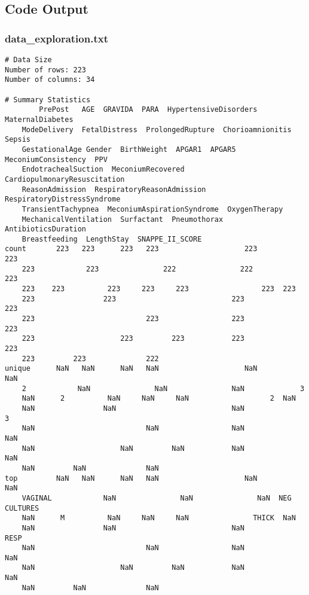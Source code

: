 \documentclass[11pt]{article}
\begin{document}
\subsection{Code Output}

\subsubsection*{data\_exploration.txt}

\begin{Verbatim}[tabsize=4]
# Data Size
Number of rows: 223
Number of columns: 34

# Summary Statistics
        PrePost   AGE  GRAVIDA  PARA  HypertensiveDisorders  MaternalDiabetes
	ModeDelivery  FetalDistress  ProlongedRupture  Chorioamnionitis        Sepsis
	GestationalAge Gender  BirthWeight  APGAR1  APGAR5 MeconiumConsistency  PPV
	EndotrachealSuction  MeconiumRecovered  CardiopulmonaryResuscitation
	ReasonAdmission  RespiratoryReasonAdmission  RespiratoryDistressSyndrome
	TransientTachypnea  MeconiumAspirationSyndrome  OxygenTherapy
	MechanicalVentilation  Surfactant  Pneumothorax  AntibioticsDuration
	Breastfeeding  LengthStay  SNAPPE_II_SCORE
count       223   223      223   223                    223               223
	223            223               222               222           223
	223    223          223     223     223                 223  223
	223                223                           223             223
	223                          223                 223                         223
	223                    223         223           223                  223
	223         223              222
unique      NaN   NaN      NaN   NaN                    NaN               NaN
	2            NaN               NaN               NaN             3
	NaN      2          NaN     NaN     NaN                   2  NaN
	NaN                NaN                           NaN               3
	NaN                          NaN                 NaN                         NaN
	NaN                    NaN         NaN           NaN                  NaN
	NaN         NaN              NaN
top         NaN   NaN      NaN   NaN                    NaN               NaN
	VAGINAL            NaN               NaN               NaN  NEG CULTURES
	NaN      M          NaN     NaN     NaN               THICK  NaN
	NaN                NaN                           NaN            RESP
	NaN                          NaN                 NaN                         NaN
	NaN                    NaN         NaN           NaN                  NaN
	NaN         NaN              NaN

\end{Verbatim}
\end{document}
